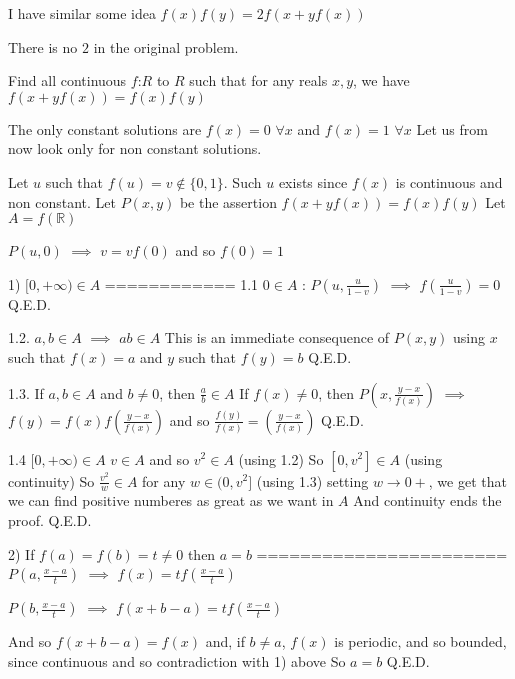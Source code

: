 \begin{solution}
	\begin{tcolorbox}I have similar some idea
$f(x)f(y)=2f(x+yf(x))$\end{tcolorbox}

There is no $2$ in the original problem.
\end{solution}



\begin{solution}
	\begin{tcolorbox}Find all continuous $f$:$R$ to $R$ such that for any reals $x,y$, we have
$f(x+yf(x))=f(x)f(y)$\end{tcolorbox}
The only constant solutions are $f(x)=0$ $\forall x$ and $f(x)=1$ $\forall x$
Let us from now look only for non constant solutions.

Let $u$ such that $f(u)=v\notin\{0,1\}$. Such $u$ exists since $f(x)$ is continuous and non constant.
Let $P(x,y)$ be the assertion $f(x+yf(x))=f(x)f(y)$
Let $A=f(\mathbb R)$

$P(u,0)$ $\implies$ $v=vf(0)$ and so $f(0)=1$

1) $[0,+\infty)\in A$
============
1.1 $0\in A$ :
$P(u,\frac u{1-v})$ $\implies$ $f(\frac u{1-v})=0$ 
Q.E.D.

1.2. $a,b\in A$ $\implies$ $ab\in A$
This is an immediate consequence of $P(x,y)$ using $x$ such that $f(x)=a$ and $y$ such that $f(y)=b$
Q.E.D.

1.3. If $a,b\in A$ and $b\ne 0$, then $\frac ab\in A$
If $f(x)\ne 0$, then $P(x,\frac{y-x}{f(x)})$ $\implies$ $f(y)=f(x)f(\frac{y-x}{f(x)})$ and so $\frac{f(y)}{f(x)}=(\frac{y-x}{f(x)})$
Q.E.D.

1.4 $[0,+\infty)\in A$
$v\in A$ and so $v^2\in A$ (using 1.2)
So $[0,v^2]\in A$ (using continuity)
So $\frac {v^2}w\in A$ for any $w\in(0,v^2]$ (using 1.3)
setting $w\to 0+$, we get that we can find positive numberes as great as we want in $A$
And continuity ends the proof.
Q.E.D.

2) If $f(a)=f(b)=t\ne 0$ then $a=b$
=======================
$P(a,\frac{x-a}t)$ $\implies$ $f(x)=tf(\frac{x-a}t)$

$P(b,\frac{x-a}t)$ $\implies$ $f(x+b-a)=tf(\frac{x-a}t)$

And so $f(x+b-a)=f(x)$ and, if $b\ne a$, $f(x)$ is periodic, and so bounded, since continuous and so contradiction with 1) above
So $a=b$
Q.E.D.


\end{solution}
